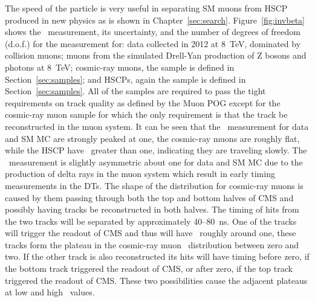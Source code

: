 The speed of the particle is very useful in separating SM muons from HSCP produced in new physics as is shown in Chapter~\ref{sec:search}.
Figure~\ref{fig:invbeta} shows the \invbeta\ measurement, its uncertainty, and the number of degrees of freedom (d.o.f.) for the measurement for:
data collected in 2012 at 8~TeV, dominated by collision muons; 
muons from the simulated Drell-Yan production of Z bosons and photons at 8~TeV; cosmic-ray muons, the sample is defined in Section~\ref{sec:samples};
and HSCPs, again the sample is defined in Section~\ref{sec:samples}. All of the samples are required to pass the tight requirements on track quality
as defined by the Muon POG except for the cosmic-ray muon sample for which the only requirement is that the track be reconstructed in the muon system.
It can be seen that the \invbeta\ measurement for data and SM MC are strongly peaked at one, the cosmic-ray muons are roughly flat, while
the HSCP have \invbeta\ greater than one, indicating they are traveling slowly. The \invbeta\ measurement is slightly asymmetric about one for data and SM MC
due to the production of delta rays in the muon system which result in early timing measurements in the DTs. The shape of the distribution for cosmic-ray muons
is caused by them passing through both the top and bottom halves of CMS and possibly having tracks be reconstructed in both halves.
The timing of hits from the two tracks will be separated by approximately 40--80~ns.
One of the tracks will trigger the readout of CMS and thus will have \invbeta\ roughly around one, these tracks form the plateau in the cosmic-ray muon \invbeta\
distribution between zero and two. If the other track is also reconstructed its hits will have timing before zero, if the bottom track triggered the readout of CMS, or
after zero, if the top track triggered the readout of CMS. These two possibilities cause the adjacent plateaus at low and high \invbeta\ values.

